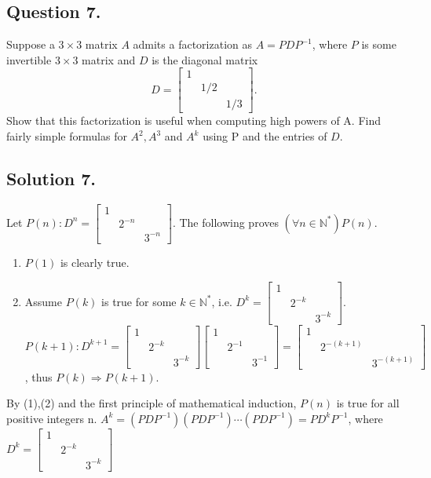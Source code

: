 \documentclass{article}
\begin{document}
\subsection*{Question 7.}
Suppose a $3\times3$ matrix $A$ admits a factorization as $A=PDP^{-1}$, where $P$ is some invertible $3\times3$ matrix and $D$ is the diagonal matrix
\[D=\left[\begin{array}{ccc}1\\&1/2\\&&1/3\end{array}\right].\]
Show that this factorization is useful when computing high powers of A. Find fairly simple formulas for $A^2,A^3$ and $A^k$ using P and the entries of $D$.
\subsection*{Solution 7.}
Let $P(n): D^n=\left[\begin{array}{rrr}1\\&2^{-n}\\&&3^{-n}\end{array}\right]$.
The following proves $(\forall n\in \mathbb{N}^*)P(n)$.
\begin{enumerate}
    \item $P(1)$ is clearly true.
    \item Assume $P(k)$ is true for some $k\in\mathbb{N}^*$, i.e. $D^k=\left[\begin{array}{rrr}1\\&2^{-k}\\&&3^{-k}\end{array}\right]$.\newline
$P(k+1): D^{k+1}=\left[\begin{array}{rrr}1\\&2^{-k}\\&&3^{-k}\end{array}\right]\left[\begin{array}{rrr}1\\&2^{-1}\\&&3^{-1}\end{array}\right]=\left[\begin{array}{rrr}1\\&2^{-(k+1)}\\&&3^{-(k+1)}\end{array}\right]$, thus $P(k)\Rightarrow P(k+1)$.
\end{enumerate}
By (1),(2) and the first principle of mathematical induction, $P(n)$ is true for all positive integers n.\newline
$A^k=(PDP^{-1})(PDP^{-1})\cdots(PDP^{-1})=P D^k P^{-1}$, where $D^k=\left[\begin{array}{rrr}1\\&2^{-k}\\&&3^{-k}\end{array}\right]$
\end{document}
